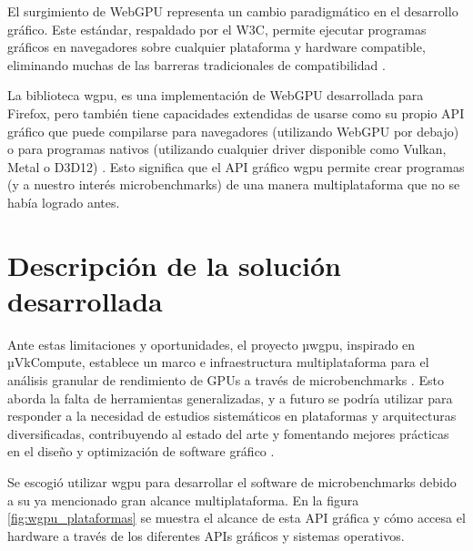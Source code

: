 \documentclass[conference]{IEEEtran}
\begin{document}
El surgimiento de WebGPU representa un cambio paradigmático en el desarrollo
gráfico. Este estándar, respaldado por el W3C, permite ejecutar programas
gráficos en navegadores sobre cualquier plataforma y hardware compatible,
eliminando muchas de las barreras tradicionales de compatibilidad \cite{webgpu}.


La biblioteca wgpu, es una implementación de WebGPU desarrollada para Firefox,
pero también tiene capacidades extendidas de usarse como su propio API gráfico
que puede compilarse para navegadores (utilizando WebGPU por debajo) o para
programas nativos (utilizando cualquier driver disponible como Vulkan, Metal o
D3D12) \cite{wgpu} \cite{devon2024gpuperformancemodelingmicrobenchmarks}. Esto
significa que el API gráfico wgpu permite crear programas (y a nuestro interés
microbenchmarks) de una manera multiplataforma que no se había logrado antes.

\section{Descripción de la solución desarrollada}

Ante estas limitaciones y oportunidades, el proyecto µwgpu, inspirado en
µVkCompute, establece un marco e infraestructura multiplataforma para el
análisis granular de rendimiento de GPUs a través de microbenchmarks
\cite{uVkCompute}. Esto aborda la falta de herramientas generalizadas, y a
futuro se podría utilizar para responder a la necesidad de estudios
sistemáticos en plataformas y arquitecturas diversificadas, contribuyendo al
estado del arte y fomentando mejores prácticas en el diseño y optimización de
software gráfico \cite{devon2024gpuperformancemodelingmicrobenchmarks}.

Se escogió utilizar wgpu para desarrollar el software de microbenchmarks debido a su ya mencionado gran alcance multiplataforma.
En la figura \ref{fig:wgpu_plataformas} se muestra el alcance de esta API gráfica y cómo accesa el hardware a través de los diferentes APIs gráficos y sistemas operativos.
\end{document}
